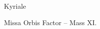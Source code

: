 \beginpart Kyriale

\beginhymn Missa Orbis Factor -- Mass XI.


\medskip



\bigskip


\medskip



\bigskip


\medskip



\bigskip


\medskip



\bigskip


\medskip



\paginaproxima




